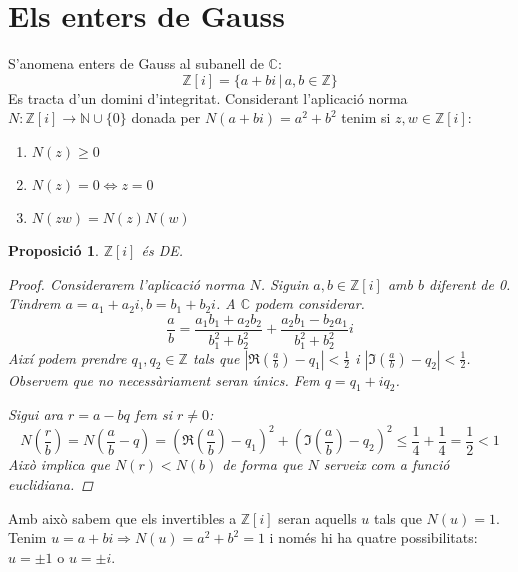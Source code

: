 \documentclass[a4paper,11pt]{report}
\newcommand{\barra}{\,|\,}
\renewcommand{\implies}{\Leftrightarrow}
\newcommand{\im}{\Rightarrow}
\theoremstyle{theorem}
\newtheorem{proposicio}{\normalfont \sffamily\bfseries Proposició}[section]
\theoremstyle{definition}
\begin{document}
\section{Els enters de Gauss }
S'anomena enters de Gauss al subanell de $\mathbb{C}$:
$$\mathbb{Z}[i]=\{a+bi\barra a,b\in \mathbb{Z}\}$$
Es tracta d'un domini d'integritat. Considerant l'aplicació norma $N:\mathbb{Z}[i]\longrightarrow\mathbb{N}\cup\{0\}$ donada per $N(a+bi)=a^2+b^2$ tenim si $z,w\in  \mathbb{Z}[i]$:
\begin{enumerate}
	\item $N(z)\geq 0$
	\item $N(z)=0\implies z=0$
	\item $N(zw)=N(z)N(w)$
\end{enumerate}
\begin{proposicio}
	$\mathbb{Z}[i]$ és DE.
	\begin{proof}
		Considerarem l'aplicació norma $N$. Siguin $a,b\in \mathbb{Z}[i]$ amb $b$ diferent de 0. Tindrem $a=a_1+a_2i,b=b_1+b_2i$. A $\mathbb{C}$ podem considerar.
		$$\frac{a}{b}=\frac{a_1b_1+a_2b_2}{b_{1}^{2}+b_{2}^{2}}+\frac{a_2b_1-b_2a_1}{b_1^2+b_{2}^{2}}i$$
		Així podem prendre $q_1,q_2\in\mathbb{Z}$ tals que $|\Re(\frac{a}{b})-q_1|<\frac{1}{2}$ i $|\mathfrak{I}(\frac{a}{b})-q_2|<\frac{1}{2}$. Observem que no necessàriament seran únics. Fem $q=q_1+iq_2$. 
		
		Sigui ara $r=a-bq$ fem si $r\neq 0$:
		$$N(\frac{r}{b})=N(\frac{a}{b}-q)=(\Re(\frac{a}{b})-q_1)^2+(\mathfrak{I}(\frac{a}{b})-q_2)^2\leq\frac{1}{4}+\frac{1}{4}=\frac{1}{2}<1$$
		Això implica que $N(r)<N(b)$ de forma que $N$ serveix com a funció euclidiana.
	\end{proof}

\end{proposicio}
Amb això sabem que els invertibles a $\mathbb{Z}[i]$ seran aquells $u$ tals que $N(u)=1$. Tenim $u=a+bi\im N(u)=a^2+b^2=1$ i només hi ha quatre possibilitats: $u=\pm 1$ o $u=\pm i$.
\end{document}
